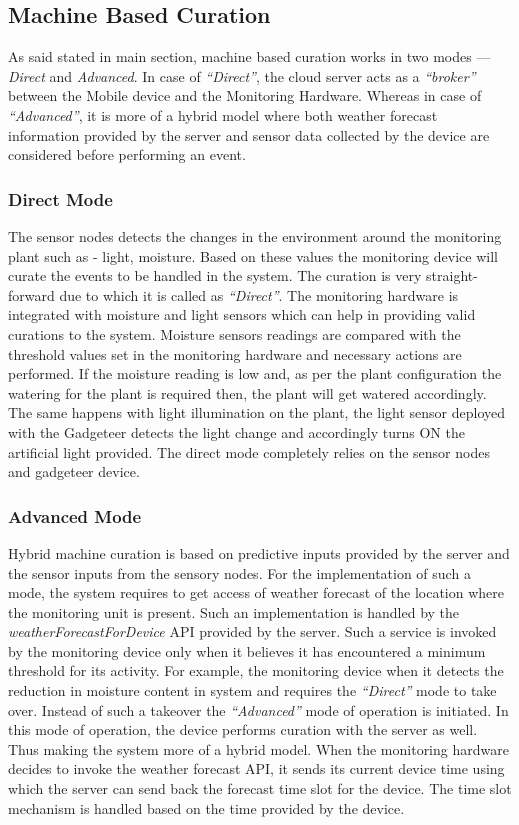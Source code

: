 \documentclass[10pt]{article}
\begin{document}
\subsection*{Machine Based Curation}

 As said stated in main section, machine based curation works in two modes --- \emph{Direct} and \emph{Advanced}. 
In case of \emph{``Direct''}, the cloud server acts as a \emph{``broker''} between the Mobile device and the Monitoring Hardware. 
Whereas in case of \emph{``Advanced''}, it is more of a hybrid model where both weather forecast information provided by the server and sensor data collected by the device are considered before performing an event.

\subsubsection*{Direct Mode}

The sensor nodes detects the changes in the environment around the monitoring plant such as - light, moisture. 
Based on these values the monitoring device will curate the events to be handled in the system. 
The curation is very straight-forward due to which it is called as \emph{``Direct''}. 
The monitoring hardware is integrated with moisture and light sensors which can help in providing valid curations to the system. 
Moisture sensors readings are compared with the threshold values set in the monitoring hardware and necessary actions are performed. 
If the moisture reading is low and, as per the plant configuration the watering for the plant is required then, the plant will get watered accordingly.
The same happens with light illumination on the plant, the light sensor deployed with the Gadgeteer detects the light change and accordingly turns ON the artificial light provided.
The direct mode completely relies on the sensor nodes and gadgeteer device.

\subsubsection*{Advanced Mode}

Hybrid machine curation is based on predictive inputs provided by the server and the sensor inputs from the sensory nodes. 
For the implementation of such a mode, the system requires to get access of weather forecast of the location where the monitoring unit is present.
Such an implementation is handled by the \emph{weatherForecastForDevice} API provided by the server.
Such a service is invoked by the monitoring device only when it believes it has encountered a minimum threshold for its activity. 
For example, the monitoring device when it detects the reduction in moisture content in system and requires the \emph{``Direct''} mode to take over.
Instead of such a takeover the \emph{``Advanced''} mode of operation is initiated.
In this mode of operation, the device performs curation with the server as well. 
Thus making the system more of a hybrid model.
When the monitoring hardware decides to invoke the weather forecast API, it sends its current device time using which the server can send back the forecast time slot for the device.
The time slot mechanism is handled based on the time provided by the device.
\end{document}
